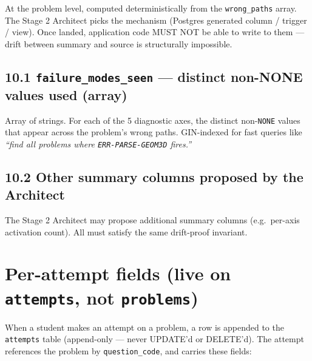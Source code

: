 \documentclass[11pt,letterpaper]{article}
\newcommand{\cd}[1]{\texttt{\small #1}}
\begin{document}
At the problem level, computed deterministically from the \cd{wrong\_paths} array. The Stage 2 Architect picks the mechanism (Postgres generated column / trigger / view). Once landed, application code MUST NOT be able to write to them --- drift between summary and source is structurally impossible.

\subsection*{10.1 \cd{failure\_modes\_seen} --- distinct non-NONE values used (array)}

Array of strings. For each of the 5 diagnostic axes, the distinct non-\cd{NONE} values that appear across the problem's wrong paths. GIN-indexed for fast queries like \emph{``find all problems where \cd{ERR-PARSE-GEOM3D} fires.''}

\subsection*{10.2 Other summary columns proposed by the Architect}

The Stage 2 Architect may propose additional summary columns (e.g.\ per-axis activation count). All must satisfy the same drift-proof invariant.

\newpage
\section{Per-attempt fields (live on \cd{attempts}, not \cd{problems})}\label{sec:attempt}

When a student makes an attempt on a problem, a row is appended to the \cd{attempts} table (append-only --- never UPDATE'd or DELETE'd). The attempt references the problem by \cd{question\_code}, and carries these fields:
\end{document}
